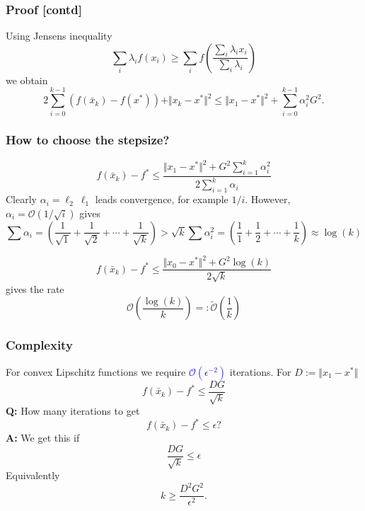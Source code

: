 \documentclass{beamer}
\begin{document}
\begin{frame}
  \frametitle{Proof [contd]}
  Using Jensens inequality %
  \begin{equation}
    \sum_{i} \lambda_i f(x_i) \ge \sum_{i} f \left( \frac{\sum_{i} \lambda_i x_i}{\sum_{i}\lambda_i} \right)
  \end{equation}
  we obtain
  \begin{equation}
    2\sum_{i=0}^{k-1}  (f(\bar{x}_k) - f(x^*)) + \Vert x_{k} - x^* \Vert^2 \le \Vert x_1-x^* \Vert^2 +  \sum_{i=0}^{k-1} \alpha_i^2 G^2.
  \end{equation}

\end{frame}

\begin{frame}
  \frametitle{How to choose the stepsize?}
  \begin{equation}
    f(\bar{x}_k) - f^* \le \frac{\Vert x_1-x^*\Vert^2 + G^2 \sum_{i=1}^{k}\alpha_i^2}{2 \sum_{i=1}^{k}\alpha_i}
  \end{equation}
  Clearly $\alpha_i = \ell_2\ \ell_1$ leads convergence, for example $1/i$.
  However, $\alpha_i = \mathcal{O}(1/\sqrt{i})$ gives
  \begin{equation}
    \sum \alpha_i = (\frac{1}{\sqrt{1}} + \frac{1}{\sqrt{2}} + \cdots +  \frac{1}{\sqrt{k}}) > \sqrt{k}
    \sum \alpha_i^2 = (\frac{1}{1} + \frac{1}{2} + \cdots + \frac{1}{k}) \approx \log(k)
  \end{equation}

  \begin{equation}
    f(\bar{x}_k) - f^* \le \frac{\Vert x_0-x^*\Vert^2 + G^2 \log(k)}{2 \sqrt{k}}
  \end{equation}
  gives the rate
  \begin{equation}
    \mathcal{O}\left(\frac{\log(k)}{k}\right) =: \tilde{\mathcal{O}}\left(\frac{1}{k}\right)
  \end{equation}
\end{frame}

\begin{frame}
  \frametitle{Complexity}
  For convex Lipschitz functions we require \textcolor{blue}{$\mathcal{O}(\epsilon^{-2})$} iterations. For $D:= \Vert x_1 -x^* \Vert$
  \begin{equation}
    f(\bar{x}_k) - f^* \le \frac{D G}{\sqrt{k}}
  \end{equation}
  \textbf{Q:} How many iterations to get
  \begin{equation}
    f(\bar{x}_k) - f^* \le \epsilon ?
  \end{equation}
  \textbf{A:} We get this if
  \begin{equation}
    \frac{D G}{\sqrt{k}} \le \epsilon
  \end{equation}
  Equivalently
  \begin{equation}
    k \ge \frac{D^2 G^2}{\epsilon^2}.
  \end{equation}
\end{frame}
\end{document}
